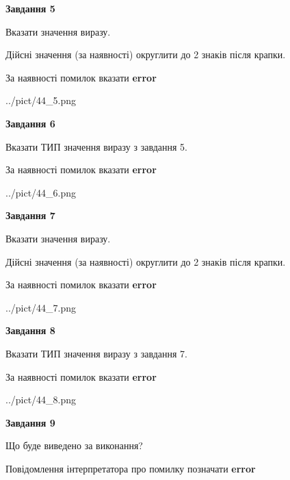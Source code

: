 \documentclass[11pt, ukrainian]{article}
\begin{document}
{\begin {large}
{\begin {center}\textbf{Завдання 5}\end {center}}\par
Вказати значення виразу. \par
Дійсні значення (за наявності) округлити до 2 знаків після крапки. \par
За наявності помилок вказати \textbf{error}

\begin{center}
	{../pict/44_5.png}
\end{center}
\newpage

{\begin {center}\textbf{Завдання 6}\end {center}}\par
Вказати ТИП значення виразу з завдання 5. \par
За наявності помилок вказати \textbf{error}

\begin{center}
	{../pict/44_6.png}
\end{center}
\newpage

{\begin {center}\textbf{Завдання 7}\end {center}}\par
Вказати значення виразу. \par
Дійсні значення (за наявності) округлити до 2 знаків після крапки. \par
За наявності помилок вказати \textbf{error}

\begin{center}
	{../pict/44_7.png}
\end{center}
\newpage

{\begin {center}\textbf{Завдання 8}\end {center}}\par
Вказати ТИП значення виразу з завдання 7. \par
За наявності помилок вказати \textbf{error}

\begin{center}
	{../pict/44_8.png}
\end{center}
\newpage

{\begin {center}\textbf{Завдання 9}\end {center}}\par
Що буде виведено за виконання? \par
Повідомлення інтерпретатора про помилку позначати \textbf{error}


\end{large}}
\end{document}
